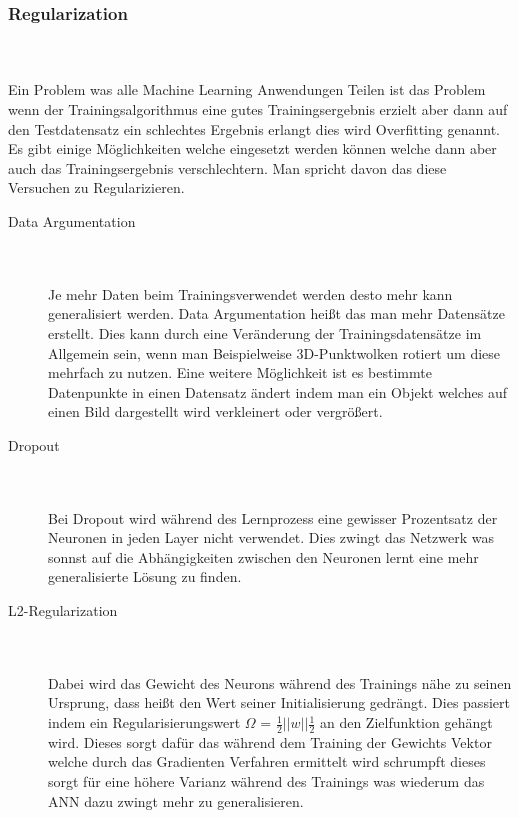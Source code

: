 \documentclass{llncs}
\begin{document}
	
	\subsubsection{Regularization}
	~\\\\
	Ein Problem was alle Machine Learning Anwendungen Teilen ist das Problem wenn der Trainingsalgorithmus eine gutes Trainingsergebnis erzielt aber dann auf den Testdatensatz ein schlechtes Ergebnis erlangt dies wird Overfitting genannt. Es gibt einige Möglichkeiten welche eingesetzt werden können welche dann aber auch das Trainingsergebnis verschlechtern. Man spricht davon das diese Versuchen zu Regularizieren.
	\newpage
	\begin{description}
		\item[Data Argumentation]
		~\\\\
		Je mehr Daten beim Trainingsverwendet werden desto mehr kann generalisiert werden. Data Argumentation heißt das man mehr Datensätze erstellt. Dies kann durch eine Veränderung der Trainingsdatensätze im Allgemein sein, wenn man Beispielweise 3D-Punktwolken rotiert um diese mehrfach zu nutzen. Eine weitere Möglichkeit ist es bestimmte 
		Datenpunkte in einen Datensatz ändert indem man ein Objekt welches auf einen Bild dargestellt wird verkleinert oder vergrößert\cite{Grundlagen}. 
		\item[Dropout]
		~\\\\
		Bei Dropout wird während des Lernprozess eine gewisser Prozentsatz der Neuronen in jeden Layer nicht verwendet. Dies zwingt das Netzwerk was sonnst auf die Abhängigkeiten zwischen den Neuronen lernt eine mehr generalisierte Lösung zu finden.
		\item[L2-Regularization]
		~\\\\
		Dabei wird das Gewicht des Neurons während des Trainings nähe zu seinen Ursprung, dass heißt den Wert seiner Initialisierung gedrängt. Dies passiert indem ein Regularisierungswert $\Omega$ = $\frac{1}{2}||w||\frac{1}{2}$ an den Zielfunktion gehängt wird. Dieses sorgt dafür das während dem Training der Gewichts Vektor welche durch das Gradienten Verfahren ermittelt wird schrumpft dieses sorgt für eine höhere Varianz während des Trainings was wiederum das ANN dazu zwingt mehr zu generalisieren\cite{Grundlagen}. 
	\end{description}
	
\end{document}
